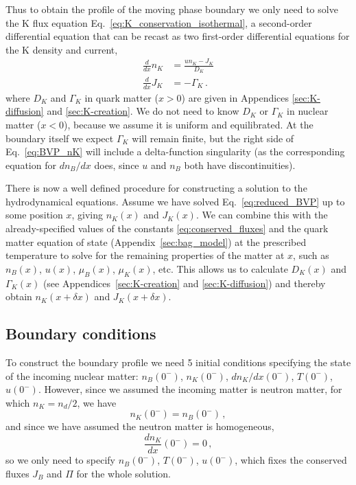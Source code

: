 \documentclass[10pt,superscriptaddress,
amsmath,aps,prc,twocolumn,nofootinbib,floatfix]{revtex4-1}
\newcommand{\mga}[1]{{\color[rgb]{0.6,0,0}#1}}
\newcommand{\Ga}{\Gamma}
\newcommand{\de}{\delta}
\begin{document}
Thus to obtain the profile of the moving phase boundary we only need to solve the K flux equation Eq.~\eqref{eq:K_conservation_isothermal}, a second-order differential equation that can be recast as two first-order differential equations for the K density and current,
\begin{subequations}
\label{eq:reduced_BVP}
\begin{align}
 \frac{d}{dx}n_K &=\frac{un_K-J_K}{D_K}
\label{eq:BVP_nK}\\
 \frac{d}{dx}J_K &=-\Gamma_K\,.
\label{eq:BVP_jK}
\end{align}
\end{subequations}
%
where $D_K$ and $\Ga_K$ in quark matter ($x>0$) are given in Appendices \ref{sec:K-diffusion} and \ref{sec:K-creation}. We do not need to know $D_K$ or $\Ga_K$  in nuclear matter ($x<0$), because we assume it is uniform and equilibrated. At the boundary itself we expect $\Ga_K$ will remain finite, but \mga{the right side of Eq.~\eqref{eq:BVP_nK} will include a 
delta-function singularity (as the corresponding equation for $dn_B/dx$ does, since $u$ and $n_B$ both have discontinuities).
} 

There is now a well defined procedure for constructing a solution to the hydrodynamical equations.  
Assume we have solved Eq.~\eqref{eq:reduced_BVP} up to some position $x$, giving $n_K(x)$ and $J_K(x)$.
We can combine this with the already-specified values of the constants \eqref{eq:conserved_fluxes} and the quark matter equation of state (Appendix~\ref{sec:bag_model}) at the prescribed temperature to solve for the remaining properties of the matter at $x$, such as $n_B(x)$, $u(x)$, $\mu_B(x)$, $\mu_K(x)$, etc.
This allows us to calculate $D_K(x)$ and $\Gamma_K(x)$ (see Appendices~\ref{sec:K-creation} and \ref{sec:K-diffusion}) and thereby obtain $n_K(x+\de x)$ and $J_K(x+\de x)$.

\subsection{Boundary conditions}
\label{sec:boundary_conditions}

To construct the boundary profile we need 5 initial conditions  specifying the state of the incoming nuclear matter: $n_B(0^-)$, $n_K(0^-)$, $dn_K/dx(0^-)$, $T(0^-)$, $u(0^-)$.
However, since we assumed the incoming matter is  neutron matter, for which $n_K=n_d/2$, we have
\begin{equation}
  n_K(0^-)=n_B(0^-)\,,
  \label{eq:nK-nuclear}
\end{equation}
and since we have assumed the neutron matter is homogeneous,
\begin{equation}
  \dfrac{dn_K}{dx}(0^-)=0\,,
  \label{eq:dnKdx-nuclear}
\end{equation}
so we only need to specify $n_B(0^-)$,  $T(0^-)$, $u(0^-)$, which fixes the conserved fluxes $J_B$ and $\Pi$ for the whole solution.
\end{document}

